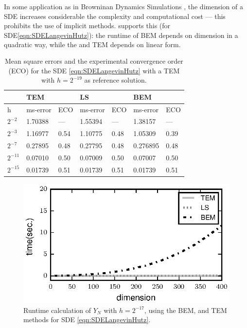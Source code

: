 \begin{example}
	In some application as in Browninan Dynamics Simulations \cite{Cruz2012}, the dimension of a SDE
	increases considerable the complexity and computational cost --- this prohibits the use of implicit methods.
	 supports this (for SDE\eqref{eqn:SDELangevinHutz}): the runtime of BEM depends on 
	dimension in a quadratic way, while the \SM and TEM depends on linear form.     
	\begin{table}[t]
		\centering
		\begin{tabular}{lllllll}
			&        TEM &        	& LS		&           & BEM		 &         \\
			\toprule
			h		& ms-error	 & ECO 		& ms-error	    & ECO		& ms-error	 &	ECO	  \\
			\midrule
			$2^{-2}$	& \num{1.70388}    & ---		&\num{1.55394}		& ---		& \num{1.38157}	& 
			--- \\
			$2^{-3}$	& \num{1.16977}    & \num{0.54}     &\num{1.10775}    & \num{0.48} & \num{1.05309}	& 
			\num{0.39} \\ 
			$2^{-7}$	&\num{0.27895}     & \num{0.48} & \num{0.27795}   & \num{0.48} & \num{0.276895}& 
			\num{0.48} \\
			$2^{-11}$	& \num{0.07010}  & \num{0.50} & \num{0.07009}  & \num{0.50} & \num{0.07007} & 
			\num{0.50} \\
			$2^{-15}$	& \num{0.01739}  & \num{0.51} & \num{0.01739}  & \num{0.51} & \num{0.01739}& 
			\num{0.51} \\
			\bottomrule
		\end{tabular}
		\caption{
			Mean square errors and the experimental convergence order (ECO) for the SDE \eqref{eqn:SDELangevinHutz} 
			with a TEM with $h = 2^{-19}$ as reference solution.
		}\label{tbl:OrdersLS}
	\end{table}
	\begin{figure}[t]
		\centering
			\includegraphics{./papers/paperB/figures/TimeVsDimension}
		\caption{
			Runtime calculation of $Y_N$ with $h=2^{-17}$, using the BEM,  \SM and TEM methods for 
			SDE \eqref{eqn:SDELangevinHutz}.
		}
		\label{fig:TimeVsDimension}
	\end{figure}
\end{example}

